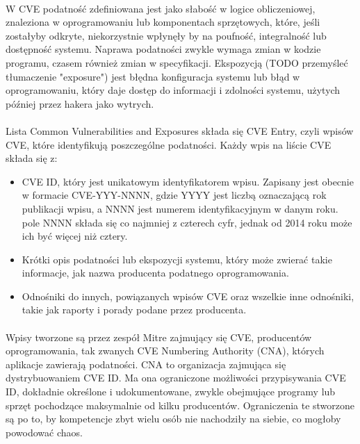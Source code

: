 \documentclass[a4paper,12pt,twoside]{article}
\begin{document}
\paragraph{}
W CVE podatność zdefiniowana jest jako słabość w logice obliczeniowej, znaleziona w oprogramowaniu lub komponentach sprzętowych, które, jeśli zostałyby odkryte, niekorzystnie wpłynęły by na poufność, integralność lub dostępność systemu. Naprawa podatności zwykle wymaga zmian w kodzie programu, czasem również zmian w specyfikacji. Ekspozycją (TODO przemyśleć tłumaczenie "exposure") jest błędna konfiguracja systemu lub błąd w oprogramowaniu, który daje dostęp do informacji i zdolności systemu, użytych później przez hakera jako wytrych\cite{cve_mitre_terms}.   
\paragraph{}
Lista Common Vulnerabilities and Exposures składa się CVE Entry, czyli wpisów CVE, które identyfikują poszczególne podatności. \newline Każdy wpis na liście CVE składa się z:
\begin{itemize}
\item CVE ID, który jest unikatowym identyfikatorem wpisu. Zapisany jest obecnie w formacie CVE-YYY-NNNN, gdzie YYYY jest liczbą oznaczającą rok publikacji wpisu, a NNNN jest numerem identyfikacyjnym w danym roku. pole NNNN składa się co najmniej z czterech cyfr, jednak od 2014 roku może ich być więcej niż cztery.
\item Krótki opis podatności lub ekspozycji systemu, który może zwierać takie informacje, jak nazwa producenta podatnego oprogramowania.
\item Odnośniki do innych, powiązanych wpisów CVE oraz wszelkie inne odnośniki, takie jak raporty i porady podane przez producenta.
\end{itemize}
\paragraph{}
Wpisy tworzone są przez zespół Mitre zajmujący się CVE, producentów oprogramowania, tak zwanych CVE Numbering Authority (CNA), których aplikacje zawierają podatności. CNA to organizacja zajmująca się dystrybuowaniem CVE ID. Ma ona ograniczone możliwości przypisywania CVE ID, dokładnie określone i udokumentowane, zwykle obejmujące programy lub sprzęt pochodzące maksymalnie od kilku producentów. Ograniczenia te stworzone są po to, by kompetencje zbyt wielu osób nie nachodziły na siebie, co mogłoby powodować chaos\cite{cve_mitre_cna_doc}.
\end{document}
